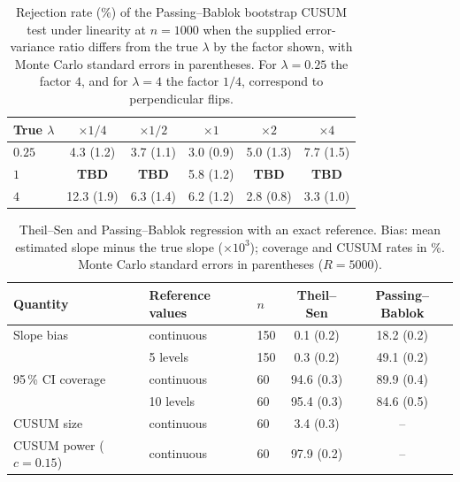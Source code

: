 \begin{table}[htbp]
\centering
\caption{Rejection rate (\%) of the Passing--Bablok bootstrap CUSUM test under linearity at $n = 1000$ when the supplied error-variance ratio differs from the true $\lambda$ by the factor shown, with Monte Carlo standard errors in parentheses. For $\lambda = 0.25$ the factor $4$, and for $\lambda = 4$ the factor $1/4$, correspond to perpendicular flips.}
\label{tab:supp:sim:cusum_lambda_misspec}
\begin{tabular}{lccccc}
\hline
True $\lambda$ & $\times 1/4$ & $\times 1/2$ & $\times 1$ & $\times 2$ & $\times 4$ \\
\hline
$0.25$ & 4.3 (1.2) & 3.7 (1.1) & 3.0 (0.9) & 5.0 (1.3) & 7.7 (1.5) \\
$1$    & \textbf{TBD} & \textbf{TBD} & 5.8 (1.2) & \textbf{TBD} & \textbf{TBD} \\
$4$    & 12.3 (1.9) & 6.3 (1.4) & 6.2 (1.2) & 2.8 (0.8) & 3.3 (1.0) \\
\hline
\end{tabular}
\end{table}

\begin{table}[htbp]
\centering
\caption{Theil--Sen and Passing--Bablok regression with an exact reference. Bias: mean estimated slope minus the true slope ($\times 10^{3}$); coverage and CUSUM rates in \%. Monte Carlo standard errors in parentheses ($R = 5000$).}
\label{tab:supp:sim:theil_sen}
\begin{tabular}{lllcc}
\hline
Quantity & Reference values & $n$ & Theil--Sen & Passing--Bablok \\
\hline
Slope bias          & continuous & 150 & 0.1 (0.2)  & 18.2 (0.2) \\
                    & 5 levels   & 150 & 0.3 (0.2)  & 49.1 (0.2) \\
95\,\% CI coverage  & continuous & 60  & 94.6 (0.3) & 89.9 (0.4) \\
                    & 10 levels  & 60  & 95.4 (0.3) & 84.6 (0.5) \\
CUSUM size          & continuous & 60  & 3.4 (0.3)  & -- \\
CUSUM power ($c = 0.15$) & continuous & 60 & 97.9 (0.2) & -- \\
\hline
\end{tabular}
\end{table}

